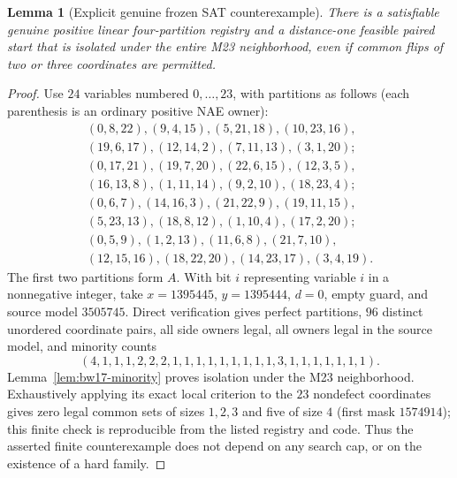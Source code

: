 \documentclass[11pt]{article}
\newtheorem{lemma}[theorem]{Lemma}
\begin{document}
\begin{lemma}[Explicit genuine frozen SAT counterexample]\label{lem:bw17-frozen}
There is a satisfiable genuine positive linear four-partition registry and a distance-one feasible paired start that is isolated under the entire M23 neighborhood, even if common flips of two or three coordinates are permitted.
\end{lemma}
\begin{proof}
Use $24$ variables numbered $0,\ldots,23$, with partitions as follows (each parenthesis is an ordinary positive NAE owner):
\[
\begin{array}{l}
(0,8,22),(9,4,15),(5,21,18),(10,23,16),\\
(19,6,17),(12,14,2),(7,11,13),(3,1,20);\\
(0,17,21),(19,7,20),(22,6,15),(12,3,5),\\
(16,13,8),(1,11,14),(9,2,10),(18,23,4);\\
(0,6,7),(14,16,3),(21,22,9),(19,11,15),\\
(5,23,13),(18,8,12),(1,10,4),(17,2,20);\\
(0,5,9),(1,2,13),(11,6,8),(21,7,10),\\
(12,15,16),(18,22,20),(14,23,17),(3,4,19).
\end{array}
\]
The first two partitions form $A$. With bit $i$ representing variable $i$ in a nonnegative integer, take $x=1395445$, $y=1395444$, $d=0$, empty guard, and source model $3505745$. Direct verification gives perfect partitions, $96$ distinct unordered coordinate pairs, all side owners legal, all owners legal in the source model, and minority counts
\[
(4,1,1,1,2,2,2,1,1,1,1,1,1,1,1,1,3,1,1,1,1,1,1,1).
\]
Lemma~\ref{lem:bw17-minority} proves isolation under the M23 neighborhood. Exhaustively applying its exact local criterion to the $23$ nondefect coordinates gives zero legal common sets of sizes $1,2,3$ and five of size $4$ (first mask $1574914$); this finite check is reproducible from the listed registry and code. Thus the asserted finite counterexample does not depend on any search cap, or on the existence of a hard family.
\end{proof}
\end{document}
